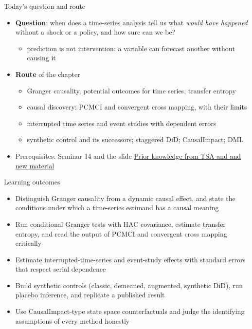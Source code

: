 \begin{frame}{Today's question and route}
\itemsize{\small}
\begin{itemize}
    \item \textbf{Question}: when does a time-series analysis tell us what \textit{would have happened} without a shock or a policy, and how sure can we be?
    \begin{itemize}
        \item prediction is not intervention: a variable can forecast another without causing it
    \end{itemize}
    \item \textbf{Route} of the chapter
    \begin{itemize}
        \item Granger causality, potential outcomes for time series, transfer entropy
        \item causal discovery: PCMCI and convergent cross mapping, with their limits
        \item interrupted time series and event studies with dependent errors
        \item synthetic control and its successors; staggered DiD; CausalImpact; DML
    \end{itemize}
    \item Prerequisites: Seminar 14 and the slide \hyperlink{c14known}{\textcolor{MainBlue}{Prior knowledge from TSA and  and new material}}
\end{itemize}
\end{frame}

\begin{frame}{Learning outcomes}
\itemsize{\small}
\begin{itemize}
    \item Distinguish Granger causality from a dynamic causal effect, and state the conditions under which a time-series estimand has a causal meaning
    \item Run conditional Granger tests with HAC covariance, estimate transfer entropy, and read the output of PCMCI and convergent cross mapping critically
    \item Estimate interrupted-time-series and event-study effects with standard errors that respect serial dependence
    \item Build synthetic controls (classic, demeaned, augmented, synthetic DiD), run placebo inference, and replicate a published result
    \item Use CausalImpact-type state space counterfactuals and judge the identifying assumptions of every method honestly
\end{itemize}
\end{frame}

